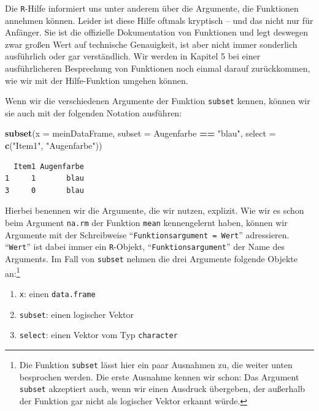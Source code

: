 \documentclass[12pt,]{tufte-book}
\newenvironment{Shaded}{\begin{snugshade}}{\end{snugshade}}
\newcommand{\KeywordTok}[1]{\textcolor[rgb]{0.13,0.29,0.53}{\textbf{#1}}}
\newcommand{\DataTypeTok}[1]{\textcolor[rgb]{0.13,0.29,0.53}{#1}}
\newcommand{\StringTok}[1]{\textcolor[rgb]{0.31,0.60,0.02}{#1}}
\newcommand{\OperatorTok}[1]{\textcolor[rgb]{0.81,0.36,0.00}{\textbf{#1}}}
\newcommand{\NormalTok}[1]{#1}
\providecommand{\tightlist}{%
  \setlength{\itemsep}{0pt}\setlength{\parskip}{0pt}}
\theoremstyle{definition}
\theoremstyle{definition}
\theoremstyle{definition}
\theoremstyle{remark}
\begin{document}
Die \texttt{R}-Hilfe informiert uns unter anderem über die Argumente,
die Funktionen annehmen können. Leider ist diese Hilfe oftmals kryptisch
-- und das nicht nur für Anfänger. Sie ist die offizielle Dokumentation
von Funktionen und legt deswegen zwar großen Wert auf technische
Genauigkeit, ist aber nicht immer sonderlich ausführlich oder gar
verständlich. Wir werden in Kapitel 5 bei einer ausführlicheren
Besprechung von Funktionen noch einmal darauf zurückkommen, wie wir mit
der Hilfe-Funktion umgehen können.

Wenn wir die verschiedenen Argumente der Funktion \texttt{subset}
kennen, können wir sie auch mit der folgenden Notation ausführen:

\begin{Shaded}
\begin{Highlighting}[]
\KeywordTok{subset}\NormalTok{(}\DataTypeTok{x =}\NormalTok{ meinDataFrame, }\DataTypeTok{subset =}\NormalTok{ Augenfarbe }\OperatorTok{==}\StringTok{ }
\StringTok{    "blau"}\NormalTok{, }\DataTypeTok{select =} \KeywordTok{c}\NormalTok{(}\StringTok{"Item1"}\NormalTok{, }\StringTok{"Augenfarbe"}\NormalTok{))}
\end{Highlighting}
\end{Shaded}

\begin{verbatim}
  Item1 Augenfarbe
1     1       blau
3     0       blau
\end{verbatim}

Hierbei benennen wir die Argumente, die wir nutzen, explizit. Wie wir es
schon beim Argument \texttt{na.rm} der Funktion \texttt{mean}
kennengelernt haben, können wir Argumente mit der Schreibweise
``\texttt{Funktionsargument\ =\ Wert}'' adressieren. ``\texttt{Wert}''
ist dabei immer ein \texttt{R}-Objekt, ``\texttt{Funktionsargument}''
der Name des Arguments. Im Fall von \texttt{subset} nehmen die drei
Argumente folgende Objekte an:\footnote{Die Funktion \texttt{subset}
  lässt hier ein paar Ausnahmen zu, die weiter unten besprochen werden.
  Die erste Ausnahme kennen wir schon: Das Argument \texttt{subset}
  akzeptiert auch, wenn wir einen Ausdruck übergeben, der außerhalb der
  Funktion gar nicht als logischer Vektor erkannt würde.}

\begin{enumerate}
\def\labelenumi{\arabic{enumi}.}
\tightlist
\item
  \texttt{x}: einen \texttt{data.frame}
\item
  \texttt{subset}: einen logischer Vektor
\item
  \texttt{select}: einen Vektor vom Typ \texttt{character}
\end{enumerate}
\end{document}
